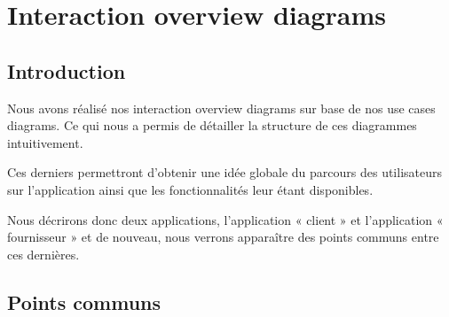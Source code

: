 \section{Interaction overview diagrams}

\subsection{Introduction}

\begin{flushleft}
Nous avons réalisé nos interaction overview diagrams sur base de nos use cases diagrams. 
Ce qui nous a permis de détailler la structure de ces diagrammes intuitivement.
\end{flushleft}

\begin{flushleft}
Ces derniers permettront d’obtenir une idée globale du parcours des utilisateurs sur l’application ainsi que les fonctionnalités leur étant disponibles.
\end{flushleft}

\begin{flushleft}
Nous décrirons donc deux applications, l’application « client » et l’application « fournisseur » et de nouveau, nous verrons apparaître des points communs entre ces dernières.
\end{flushleft}

\newpage
\subsection{Points communs}


